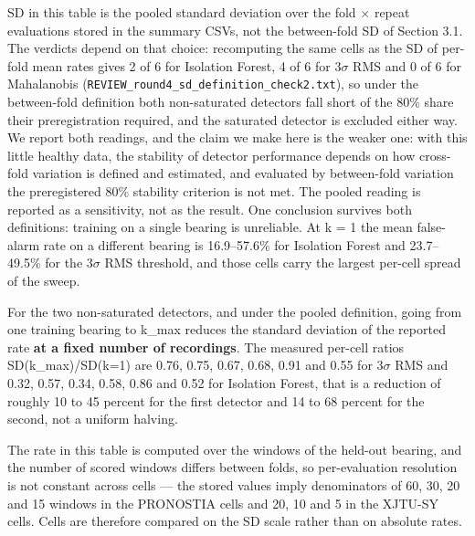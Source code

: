 \documentclass[11pt]{article}
\newcommand{\code}[1]{\texttt{#1}}
\begin{document}
SD in this table is the pooled standard deviation over the fold $\times$ repeat evaluations stored in the summary CSVs, not the between-fold SD of Section 3.1. The verdicts depend on that choice: recomputing the same cells as the SD of per-fold mean rates gives 2 of 6 for Isolation Forest, 4 of 6 for 3$\sigma$ RMS and 0 of 6 for Mahalanobis (\code{REVIEW\_round4\_sd\_definition\_check2.txt}), so under the between-fold definition both non-saturated detectors fall short of the 80\% share their preregistration required, and the saturated detector is excluded either way. We report both readings, and the claim we make here is the weaker one: with this little healthy data, the stability of detector performance depends on how cross-fold variation is defined and estimated, and evaluated by between-fold variation the preregistered 80\% stability criterion is not met. The pooled reading is reported as a sensitivity, not as the result. One conclusion survives both definitions: training on a single bearing is unreliable. At k = 1 the mean false-alarm rate on a different bearing is 16.9--57.6\% for Isolation Forest and 23.7--49.5\% for the 3$\sigma$ RMS threshold, and those cells carry the largest per-cell spread of the sweep.

For the two non-saturated detectors, and under the pooled definition, going from one training bearing to k\_max reduces the standard deviation of the reported rate \textbf{at a fixed number of recordings}. The measured per-cell ratios SD(k\_max)/SD(k=1) are 0.76, 0.75, 0.67, 0.68, 0.91 and 0.55 for 3$\sigma$ RMS and 0.32, 0.57, 0.34, 0.58, 0.86 and 0.52 for Isolation Forest, that is a reduction of roughly 10 to 45 percent for the first detector and 14 to 68 percent for the second, not a uniform halving.

The rate in this table is computed over the windows of the held-out bearing, and the number of scored windows differs between folds, so per-evaluation resolution is not constant across cells --- the stored values imply denominators of 60, 30, 20 and 15 windows in the PRONOSTIA cells and 20, 10 and 5 in the XJTU-SY cells. Cells are therefore compared on the SD scale rather than on absolute rates.
\end{document}
